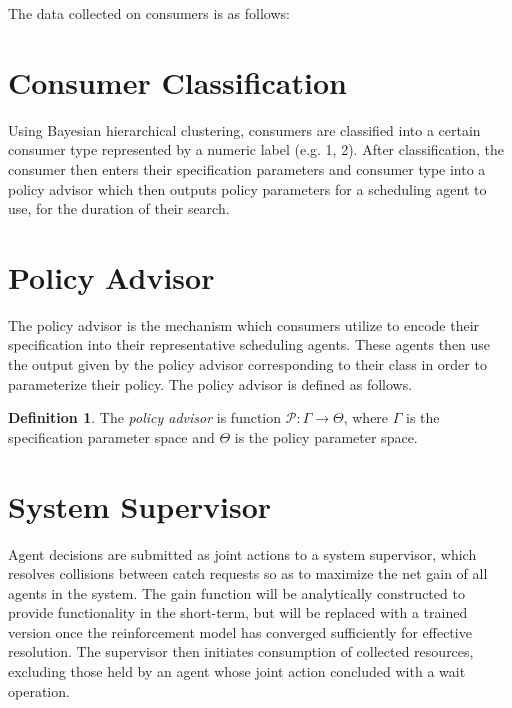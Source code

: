 \documentclass{article}
\theoremstyle{definition}
\newtheorem{definition}{Definition}[section]
\theoremstyle{remark}
\begin{document}
	The data collected on consumers is as follows:
	\begin{table}

	\end{table}

	\section{Consumer Classification}
	Using Bayesian hierarchical clustering, consumers are classified into a certain consumer type represented by a
    numeric label (e.g. 1, 2). After classification, the consumer then enters their specification parameters and
    consumer type into a policy advisor which then outputs policy parameters for a scheduling agent to use, for
    the duration of their search.
	
	\section{Policy Advisor}
	The policy advisor is the mechanism which consumers utilize to encode their specification into their
    representative scheduling agents. These agents then use the output given by the policy advisor corresponding
    to their class in order to parameterize their policy. The policy advisor is defined as follows.

    \begin{definition}
        The \emph{policy advisor} is function $\mathcal{P}: \Gamma \rightarrow \Theta$, where $\Gamma$ is the specification
		parameter space and $\Theta$ is the policy parameter space.
    \end{definition}

	\section{System Supervisor}
	
	\indent
	
	Agent decisions are submitted as joint actions to a system supervisor, which resolves collisions between catch requests so as to maximize the net gain of all agents in the system. The gain function will be analytically constructed to provide functionality in the short-term, but will be replaced with a trained version once the reinforcement model has converged sufficiently for effective resolution. The supervisor then initiates consumption of collected resources, excluding those held by an agent whose joint action concluded with a wait operation.
	
\end{document}
